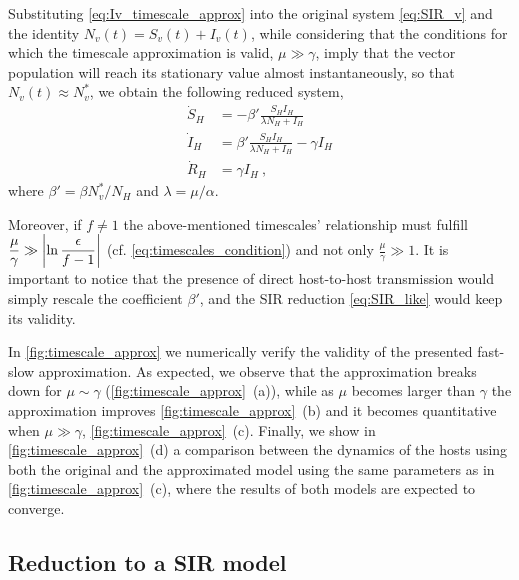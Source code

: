 Substituting \cref{eq:Iv_timescale_approx} into the original system
\cref{eq:SIR_v} and the identity $N_v(t)=S_v(t)+I_v(t)$, while considering that
the conditions for which the timescale approximation is valid, $\mu\gg\gamma$,
imply that the vector population will reach its stationary value almost
instantaneously, so that $N_v(t)\approx N_v^*$, we obtain the following reduced
system,
\begin{equation}\label{eq:SIR_like}
    \begin{aligned}
        \dot{S}_H & =-\beta'\frac{S_H I_H}{\lambda N_H + I_H}            \\
        \dot{I}_H & =\beta'\frac{S_H I_H}{\lambda N_H + I_H}- \gamma I_H \\
        \dot{R}_H & =\gamma I_H \ ,
    \end{aligned}
\end{equation}
where $\beta'=\beta N_v^*/N_H$ and $\lambda=\mu/\alpha$.

Moreover, if $f\neq1$ the above-mentioned timescales' relationship
must fulfill
$\displaystyle\frac{\mu}{\gamma}\gg\abs{\ln{\frac{\epsilon}{f-1}}}$ (cf.
\cref{eq:timescales_condition}) and not only
$\displaystyle\frac{\mu}{\gamma}\gg 1$. It is important to notice that the
presence of direct host-to-host transmission would simply rescale the
coefficient $\beta'$, and the SIR reduction \cref{eq:SIR_like} would keep its
validity.

In \cref{fig:timescale_approx} we numerically verify the validity of the
presented fast-slow approximation. As expected, we observe that the
approximation breaks down for $\mu\sim\gamma$
(\cref{fig:timescale_approx}~\textcolor{ref_color}{(a)}),
while as $\mu$ becomes larger than $\gamma$ the approximation improves
\cref{fig:timescale_approx}~\textcolor{ref_color}{(b)} and it becomes
quantitative when $\mu\gg\gamma$,
\cref{fig:timescale_approx}~\textcolor{ref_color}{(c)}. Finally, we show in
\cref{fig:timescale_approx}~\textcolor{ref_color}{(d)} a comparison between the
dynamics of the hosts
using both the original and the approximated model using the same parameters
as in \cref{fig:timescale_approx}~\textcolor{ref_color}{(c)}, where the
results of both models are
expected to converge.

\subsection{Reduction to a SIR model}

